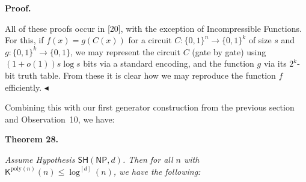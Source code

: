


\par\medskip\noindent\textbf{Proof.}\par




All of these proofs occur in [20], with the exception of Incompressible Functions. For this, if $f(x)=g(C(x))$ for a circuit $C:\{0,1\}^{n}\to\{0,1\}^{k}$ of size $s$ and $g:\{0,1\}^{k}\to\{0,1\}$, we may represent the circuit $C$ (gate by gate) using $(1+o(1))s\log s$ bits via a standard encoding, and the function $g$ via its $2^{k}$-bit truth table. From these it is clear how we may reproduce the function $f$ efficiently.
$\blacktriangleleft$\par




Combining this with our first generator construction from the previous section and Observation 10, we have:\par





\par\medskip\noindent\textbf{
\textbf{Theorem 28}\textbf{.}
}\par



\emph{Assume Hypothesis $\mathsf{SH}({\mathsf{NP}},d)$. Then for all $n$ with ${\mathsf{K}}^{\mathrm{poly}(n)}(n)\leq\log^{[d]}(n)$, we have the following:}\par


